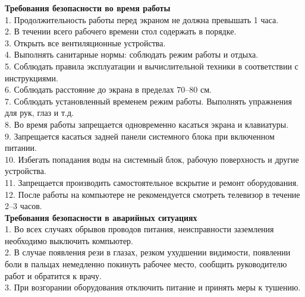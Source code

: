 \textbf{Требования безопасности во время работы}\\
1. Продолжительность  работы перед экраном не должна превышать 1 часа.\\
2. В течении всего рабочего времени стол содержать в порядке.\\
3. Открыть все вентиляционные  устройства.\\
4. Выполнять санитарные нормы: соблюдать режим работы и отдыха.\\
5. Соблюдать правила эксплуатации  и вычислительной техники в соответствии с инструкциями.\\
6. Соблюдать расстояние до экрана в пределах 70–80 см.\\
7. Соблюдать установленный временем режим работы. Выполнять упражнения для рук, глаз и т.д.\\
8. Во время работы запрещается одновременно касаться экрана и клавиатуры.\\
9. Запрещается касаться задней панели системного блока при включенном питании.\\
10. Избегать попадания воды на системный блок, рабочую поверхность  и другие устройства.\\
11. Запрещается производить самостоятельное вскрытие и ремонт оборудования.\\
12. После работы на компьютере не рекомендуется  смотреть телевизор  в течение 2–3 часов.\\

\textbf{Требования безопасности в аварийных ситуациях}\\
1. Во всех случаях обрывов проводов питания, неисправности  заземления необходимо выключить компьютер.\\
2. В  случае появления рези в глазах, резком ухудшении видимости, появлении боли в пальцах немедленно покинуть рабочее место, сообщить руководителю работ и обратится к врачу.\\
3. При  возгорании оборудования  отключить питание и принять меры к тушению.